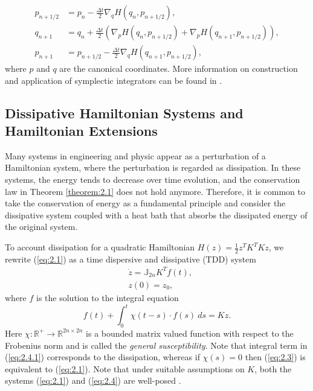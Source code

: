 \begin{equation} \label{eq:2.3}
\begin{aligned}
	p_{n+1/2} &= p_n - \frac{\Delta t}{2} \nabla_qH(q_{n},p_{n+1/2}), \\
	q_{n+1} &= q_n + \frac{\Delta t}{2} \left( \nabla_pH(q_{n},p_{n+1/2}) + \nabla_pH(q_{n+1},p_{n+1/2}) \right),\\
	p_{n+1} &= p_{n+1/2} - \frac{\Delta t}{2} \nabla_qH(q_{n+1},p_{n+1/2}),
\end{aligned}
\end{equation}
where $p$ and $q$ are the canonical coordinates. More information on construction and application of symplectic integrators can be found in \cite{Hairer:1250576}.

\subsection{Dissipative Hamiltonian Systems and Hamiltonian Extensions}

Many systems in engineering and physic appear as a perturbation of a Hamiltonian system, where the perturbation is regarded as dissipation. In these systems, the energy tends to decrease over time evolution, and the conservation law in Theorem \ref{theorem:2.1} does not hold anymore. Therefore, it is common to take the conservation of energy as a fundamental principle and consider the dissipative system coupled with a heat bath that absorbs the dissipated energy of the original system. 

To account dissipation for a quadratic Hamiltonian $H(z) = \frac 1 2 z^T K^T K  z$, we rewrite (\ref{eq:2.1}) as a time dispersive and dissipative (TDD) \cite{Figotin:2006jy} system 
\begin{equation} \label{eq:2.4}
	\begin{aligned}
		& \dot {z} = \mathbb J_{2n} K^T f(t), \\
		& z(0) = z_0,
	\end{aligned}
\end{equation}
where $f$ is the solution to the integral equation
\begin{equation} \label{eq:2.4.1}
	f(t) + \int_0^t \chi(t-s) \cdot f(s)\ ds = K z.
\end{equation}
Here $\chi:\mathbb R^+\to \mathbb R^{2n\times 2n}$ is a bounded matrix valued function with respect to the Frobenius norm and is called the \emph{general susceptibility}. Note that integral term in (\ref{eq:2.4.1}) corresponds to the dissipation, whereas if $\chi(s) = 0$ then (\ref{eq:2.3}) is equivalent to (\ref{eq:2.1}). Note that under suitable assumptions on $K$, both the systems (\ref{eq:2.1}) and (\ref{eq:2.4}) are well-posed \cite{Figotin:2006jy}.

